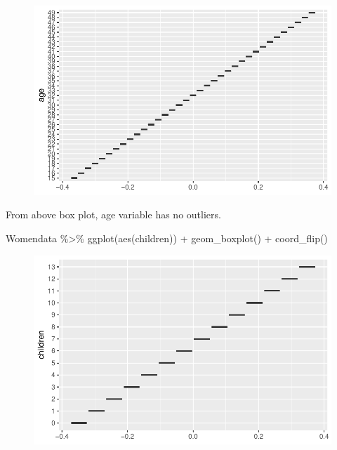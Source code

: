 \documentclass[
  letterpaper,
  DIV=11,
  numbers=noendperiod]{scrartcl}
\newenvironment{Shaded}{\begin{snugshade}}{\end{snugshade}}
\newcommand{\FunctionTok}[1]{\textcolor[rgb]{0.28,0.35,0.67}{#1}}
\newcommand{\NormalTok}[1]{\textcolor[rgb]{0.00,0.23,0.31}{#1}}
\newcommand{\SpecialCharTok}[1]{\textcolor[rgb]{0.37,0.37,0.37}{#1}}
\begin{document}
\begin{figure}[H]

{\centering \includegraphics{Fertility_Rates_Education_Impact_Botswana_files/figure-pdf/unnamed-chunk-14-1.pdf}

}

\end{figure}

From above box plot, age variable has no outliers.

\begin{Shaded}
\begin{Highlighting}[]
\NormalTok{Womendata }\SpecialCharTok{\%\textgreater{}\%}
  \FunctionTok{ggplot}\NormalTok{(}\FunctionTok{aes}\NormalTok{(children)) }\SpecialCharTok{+}
  \FunctionTok{geom\_boxplot}\NormalTok{() }\SpecialCharTok{+}
  \FunctionTok{coord\_flip}\NormalTok{()}
\end{Highlighting}
\end{Shaded}

\begin{figure}[H]

{\centering \includegraphics{Fertility_Rates_Education_Impact_Botswana_files/figure-pdf/unnamed-chunk-15-1.pdf}

}

\end{figure}
\end{document}
